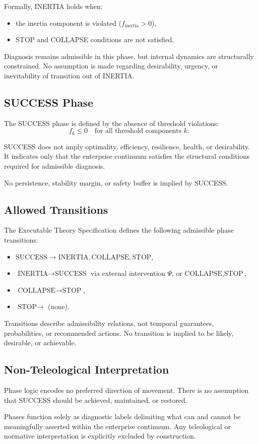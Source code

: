 Formally, INERTIA holds when:
\begin{itemize}
  \item the inertia component is violated ($f_{\text{inertia}} > 0$),
  \item STOP and COLLAPSE conditions are not satisfied.
\end{itemize}

Diagnosis remains admissible in this phase, but internal dynamics are
structurally constrained.
No assumption is made regarding desirability, urgency, or inevitability
of transition out of INERTIA.

\subsection{SUCCESS Phase}

The SUCCESS phase is defined by the absence of threshold violations:
\[
f_k \leq 0 \quad \text{for all threshold components } k.
\]

SUCCESS does not imply optimality, efficiency, resilience, health, or
desirability.
It indicates only that the enterprise continuum satisfies the structural
conditions required for admissible diagnosis.

No persistence, stability margin, or safety buffer is implied by
SUCCESS.

\subsection{Allowed Transitions}

The Executable Theory Specification defines the following admissible
phase transitions:
\begin{itemize}
  \item $\text{SUCCESS} \rightarrow \text{INERTIA}, \text{COLLAPSE},
        \text{STOP}$,
  \item $\text{INERTIA} \rightarrow \text{SUCCESS}$ via external
        intervention $\Psi$, or $\text{COLLAPSE}, \text{STOP}$,
  \item $\text{COLLAPSE} \rightarrow \text{STOP}$,
  \item $\text{STOP} \rightarrow$ (none).
\end{itemize}

Transitions describe admissibility relations, not temporal guarantees,
probabilities, or recommended actions.
No transition is implied to be likely, desirable, or achievable.

\subsection{Non-Teleological Interpretation}

Phase logic encodes no preferred direction of movement.
There is no assumption that SUCCESS should be achieved, maintained, or
restored.

Phases function solely as diagnostic labels delimiting what can and
cannot be meaningfully asserted within the enterprise continuum.
Any teleological or normative interpretation is explicitly excluded by
construction.

